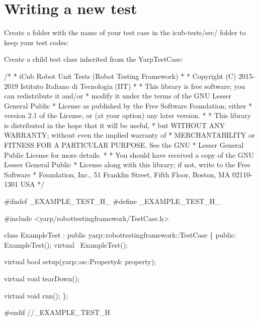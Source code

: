 \hypertarget{writing-and-running_writing-new-tests}{}\section{Writing a new test}\label{writing-and-running_writing-new-tests}
Create a folder with the name of your test case in the {\ttfamily icub-\/tests/src/} folder to keep your test codes\+:




Create a child test class inherited from the {\ttfamily Yarp\+Test\+Case}\+:


\begin{DoxyCodeInclude}
\textcolor{comment}{/*}
\textcolor{comment}{ * iCub Robot Unit Tests (Robot Testing Framework)}
\textcolor{comment}{ *}
\textcolor{comment}{ * Copyright (C) 2015-2019 Istituto Italiano di Tecnologia (IIT)}
\textcolor{comment}{ *}
\textcolor{comment}{ * This library is free software; you can redistribute it and/or}
\textcolor{comment}{ * modify it under the terms of the GNU Lesser General Public}
\textcolor{comment}{ * License as published by the Free Software Foundation; either}
\textcolor{comment}{ * version 2.1 of the License, or (at your option) any later version.}
\textcolor{comment}{ *}
\textcolor{comment}{ * This library is distributed in the hope that it will be useful,}
\textcolor{comment}{ * but WITHOUT ANY WARRANTY; without even the implied warranty of}
\textcolor{comment}{ * MERCHANTABILITY or FITNESS FOR A PARTICULAR PURPOSE.  See the GNU}
\textcolor{comment}{ * Lesser General Public License for more details.}
\textcolor{comment}{ *}
\textcolor{comment}{ * You should have received a copy of the GNU Lesser General Public}
\textcolor{comment}{ * License along with this library; if not, write to the Free Software}
\textcolor{comment}{ * Foundation, Inc., 51 Franklin Street, Fifth Floor, Boston, MA  02110-1301  USA}
\textcolor{comment}{ */}

\textcolor{preprocessor}{#ifndef \_EXAMPLE\_TEST\_H\_}
\textcolor{preprocessor}{#define \_EXAMPLE\_TEST\_H\_}

\textcolor{preprocessor}{#include <yarp/robottestingframework/TestCase.h>}

\textcolor{keyword}{class }ExampleTest : \textcolor{keyword}{public} yarp::robottestingframework::TestCase \{
\textcolor{keyword}{public}:
    ExampleTest();
    \textcolor{keyword}{virtual} ~ExampleTest();

    \textcolor{keyword}{virtual} \textcolor{keywordtype}{bool} setup(yarp::os::Property& property);

    \textcolor{keyword}{virtual} \textcolor{keywordtype}{void} tearDown();

    \textcolor{keyword}{virtual} \textcolor{keywordtype}{void} run();
\};

\textcolor{preprocessor}{#endif //\_EXAMPLE\_TEST\_H}
\end{DoxyCodeInclude}


